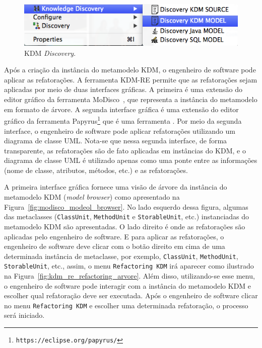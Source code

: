 \begin{figure}[h]
	\centering
	\caption{KDM \textit{Discovery}.}
	\label{fig:kdm_modisco_discovery}
	\includegraphics[scale=0.65]{images/kdm_discovery_kdm_re}
	\fautor
\end{figure}

Após a criação da instância do metamodelo KDM, o engenheiro de software pode aplicar as refatorações. A ferramenta KDM-RE permite que as refatorações sejam aplicadas por meio de duas interfaces gráficas. A primeira é uma extensão do editor gráfico da ferramenta MoDisco~\cite{Bruneliere_2014}, que representa a instância do metamodelo em formato de árvore. A segunda interface gráfica é uma extensão do editor gráfico da ferramenta Papyrus\footnote{\texttt{https://eclipse.org/papyrus/}} que é uma ferramenta . Por meio da segunda interface, o engenheiro de software pode aplicar refatorações utilizando um diagrama de classe UML. Nota-se que nessa segunda interface, de forma transparente, as refatorações são de fato aplicadas em instâncias do KDM, e o diagrama de classe UML é utilizado apenas como uma ponte entre as informações (nome de classe, atributos, métodos, etc.) e as refatorações.

A primeira interface gráfica fornece uma visão de árvore da instância do metamodelo KDM (\textit{model browser}) como apresentado na Figura~\ref{fig:modisco_modeol_browser}. No lado esquerdo dessa figura, algumas das metaclasses (\texttt{ClassUnit}, \texttt{MethodUnit} e \texttt{StorableUnit}, etc.) instanciadas do metamodelo KDM são apresentadas. O lado direito é onde as refatorações são aplicadas pelo engenheiro de software. E para aplicar as refatorações, o engenheiro de software deve clicar com o botão direito em cima de uma determinada instância de metaclasse, por exemplo, \texttt{ClassUnit}, \texttt{MethodUnit}, \texttt{StorableUnit}, etc., assim, o menu \texttt{Refactoring KDM} irá aparecer como ilustrado na Figura~\ref{fig:kdm_re_refactoring_arvore}. Além disso, utilizando-se esse menu, o engenheiro de software pode interagir com a instância do metamodelo KDM e escolher qual refatoração deve ser executada. Após o engenheiro de software clicar no menu \texttt{Refactoring KDM} e escolher uma determinada refatoração, o processo será iniciado. 

